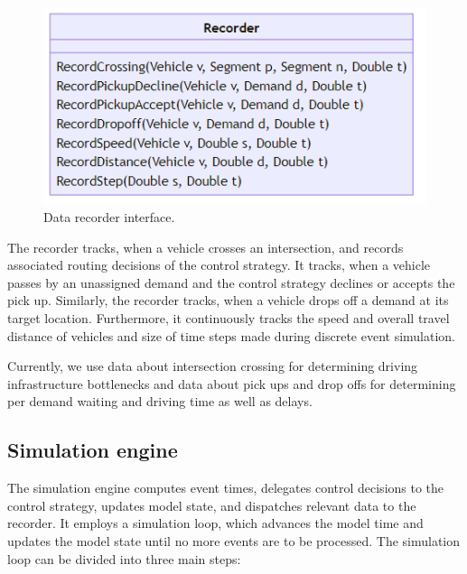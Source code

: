 \documentclass[a4paper,twoside]{article}
\begin{document}
	\begin{figure}[!ht]
		\centering
		\includegraphics[scale=0.3]{../../diagrams/statistics/classes-v2.png}
		\caption{Data recorder interface.}
		\label{fig:statistics-interface}
	\end{figure}
	
	The recorder tracks, when a vehicle crosses an intersection, and records associated routing decisions of the control strategy.
	It tracks, when a vehicle passes by an unassigned demand and the control strategy declines or accepts the pick up.
	Similarly, the recorder tracks, when a vehicle drops off a demand at its target location.
	Furthermore, it continuously tracks the speed and overall travel distance of vehicles and size of time steps made during discrete event simulation.
	
	Currently, we use data about intersection crossing for determining driving infrastructure bottlenecks and data about pick ups and drop offs for determining per demand waiting and driving time as well as delays.
	
	\subsection{Simulation engine}
	\label{sec:simulation-engine}

	
	The simulation engine computes event times, delegates control decisions to the control strategy, updates model state, and dispatches relevant data to the recorder.
	It employs a simulation loop, which advances the model time and updates the model state until no more events are to be processed.
	The simulation loop can be divided into three main steps:
	
\end{document}
